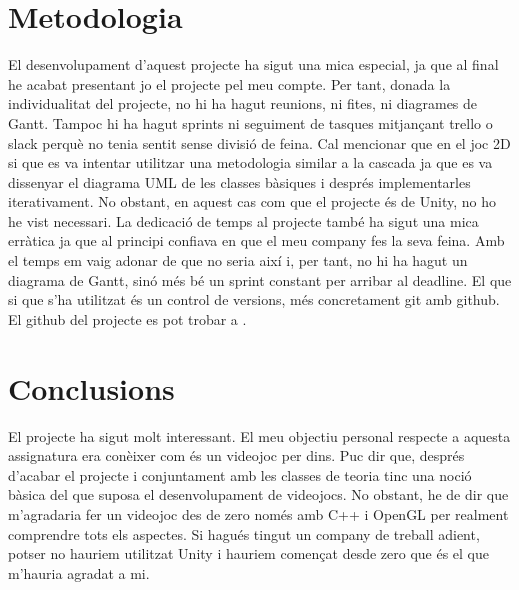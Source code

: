 \documentclass{article}
\begin{document}
\section{Metodologia}
El desenvolupament d'aquest projecte ha sigut una mica especial, ja que 
al final he acabat presentant jo el projecte pel meu compte. Per tant,
donada la individualitat del projecte, no hi ha hagut reunions, ni fites, ni
diagrames de Gantt. Tampoc hi ha hagut sprints ni seguiment de
tasques mitjançant trello o slack perquè no tenia sentit sense
divisió de feina. \newline
Cal mencionar que en el joc 2D si que es va intentar utilitzar una metodologia 
similar a la cascada ja que es va dissenyar el diagrama UML de les classes
bàsiques i després implementarles iterativament. No obstant, en aquest cas
com que el projecte és de Unity, no ho he vist necessari. \newline
La dedicació de temps al projecte també ha sigut una mica erràtica ja que al principi confiava
en que el meu company fes la seva feina. Amb el temps em vaig adonar de que
no seria així i, per tant, no hi ha hagut un diagrama de Gantt, sinó més bé
un sprint constant per arribar al deadline. El que si que s'ha utilitzat és un control de versions, més concretament git
amb github. El github del projecte es pot trobar a \cite{githubProjecte}.

\section{Conclusions}
El projecte ha sigut molt interessant. El meu objectiu personal respecte a
aquesta assignatura era conèixer com és un videojoc per dins.
Puc dir que, després d'acabar el projecte i conjuntament amb les classes de
teoria tinc una noció bàsica del que suposa el desenvolupament de videojocs.
No obstant, he de dir que m'agradaria fer un videojoc des de zero només
amb C++ i OpenGL per realment comprendre tots els aspectes.
Si hagués tingut un company de treball adient, potser no hauriem utilitzat
Unity i hauriem començat desde zero que és el que m'hauria agradat a mi. 



\end{document}
